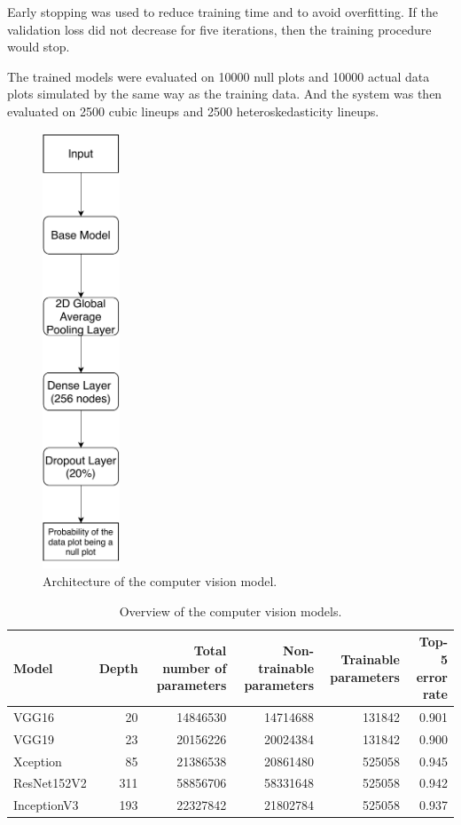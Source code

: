 \documentclass{monashthesis}
\theoremstyle{definition}
\theoremstyle{definition}
\theoremstyle{definition}
\theoremstyle{definition}
\theoremstyle{remark}
\begin{document}
Early stopping was used to reduce training time and to avoid overfitting. If the validation loss did not decrease for five iterations, then the training procedure would stop.

The trained models were evaluated on 10000 null plots and 10000 actual data plots simulated by the same way as the training data. And the system was then evaluated on 2500 cubic lineups and 2500 heteroskedasticity lineups.

\begin{figure}
\centering
\includegraphics[width=0.90625in,height=5.11458in]{figures/vi_model.pdf}
\caption{Architecture of the computer vision model. \label{fig:model-arch}}
\end{figure}

\begin{table}

\caption{\label{tab:vi-model-summary}Overview of the computer vision models.}
\centering
\begin{tabular}[t]{lrrrrr}
\toprule
Model & Depth & Total number of parameters & Non-trainable parameters & Trainable parameters & Top-5 error rate\\
\midrule
VGG16 & 20 & 14846530 & 14714688 & 131842 & 0.901\\
VGG19 & 23 & 20156226 & 20024384 & 131842 & 0.900\\
Xception & 85 & 21386538 & 20861480 & 525058 & 0.945\\
ResNet152V2 & 311 & 58856706 & 58331648 & 525058 & 0.942\\
InceptionV3 & 193 & 22327842 & 21802784 & 525058 & 0.937\\
\bottomrule
\end{tabular}
\end{table}
\end{document}
